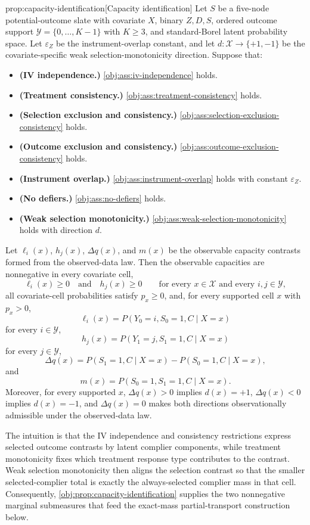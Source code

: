 \documentclass[11pt]{article}
\begin{document}
\begin{theoremv}{prop:capacity-identification}[Capacity identification]
Let \(S\) be a five-node potential-outcome slate with covariate \(X\), binary \(Z,D,S\), ordered outcome support \(\mathcal Y=\{0,\ldots,K-1\}\) with \(K\ge 3\), and standard-Borel latent probability space. Let \(\varepsilon_Z\) be the instrument-overlap constant, and let \(d:\mathcal X\to\{+1,-1\}\) be the covariate-specific weak selection-monotonicity direction. Suppose that:
\begin{itemize}
\item \textbf{(IV independence.)} \cref{obj:ass:iv-independence} holds.
\item \textbf{(Treatment consistency.)} \cref{obj:ass:treatment-consistency} holds.
\item \textbf{(Selection exclusion and consistency.)} \cref{obj:ass:selection-exclusion-consistency} holds.
\item \textbf{(Outcome exclusion and consistency.)} \cref{obj:ass:outcome-exclusion-consistency} holds.
\item \textbf{(Instrument overlap.)} \cref{obj:ass:instrument-overlap} holds with constant \(\varepsilon_Z\).
\item \textbf{(No defiers.)} \cref{obj:ass:no-defiers} holds.
\item \textbf{(Weak selection monotonicity.)} \cref{obj:ass:weak-selection-monotonicity} holds with direction \(d\).
\end{itemize}
Let \(\ell_i(x)\), \(h_j(x)\), \(\Delta q(x)\), and \(m(x)\) be the observable capacity contrasts formed from the observed-data law. Then the observable capacities are nonnegative in every covariate cell,
\[
\ell_i(x)\ge 0\quad\text{and}\quad h_j(x)\ge 0
\qquad\text{for every }x\in\mathcal X\text{ and every }i,j\in\mathcal Y,
\]
all covariate-cell probabilities satisfy \(p_x\ge 0\), and, for every supported cell \(x\) with \(p_x>0\),
\[
\ell_i(x)=P(Y_0=i,S_0=1,C\mid X=x)
\]
for every \(i\in\mathcal Y\),
\[
h_j(x)=P(Y_1=j,S_1=1,C\mid X=x)
\]
for every \(j\in\mathcal Y\),
\[
\Delta q(x)=P(S_1=1,C\mid X=x)-P(S_0=1,C\mid X=x),
\]
and
\[
m(x)=P(S_0=1,S_1=1,C\mid X=x).
\]
Moreover, for every supported \(x\), \(\Delta q(x)>0\) implies \(d(x)=+1\), \(\Delta q(x)<0\) implies \(d(x)=-1\), and \(\Delta q(x)=0\) makes both directions observationally admissible under the observed-data law.
\end{theoremv}

The intuition is that the IV independence and consistency restrictions express selected outcome contrasts by latent complier components, while treatment monotonicity fixes which treatment response type contributes to the contrast. Weak selection monotonicity then aligns the selection contrast so that the smaller selected-complier total is exactly the always-selected complier mass in that cell. Consequently, \cref{obj:prop:capacity-identification} supplies the two nonnegative marginal submeasures that feed the exact-mass partial-transport construction below.
\end{document}
